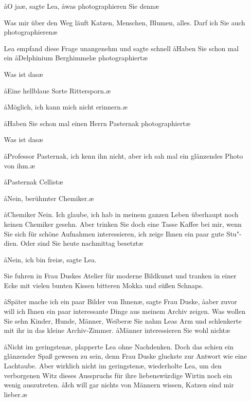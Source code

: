 \aa{}O ja\ae{}, sagte Lea, \aa{}was photographieren Sie denn\frag{}\ae{}

\aanah{}Was mir über den Weg läuft\ausr{} Katzen, Menschen, Blumen,
alles. Darf ich Sie auch photographieren\frag{}\ae{}

Lea empfand diese Frage unangenehm und sagte schnell\dopp{}
\aa{}Haben Sie schon mal ein \aa{}Delphinium Berghimmel\ae{}
photographiert\frag{}\ae{}

\aanah{}Was ist das\frag{}\ae{}

\aa{}Eine hellblaue Sorte Rittersporn.\ae{}

\aa{}Möglich, ich kann mich nicht erinnern.\ae{}

\aa{}Haben Sie schon mal einen Herrn Pasternak photographiert\frag{}\ae{}

\aanah{}Was ist das\frag{}\ae{}

\aa{}Professor Pasternak, ich kenn ihn nicht, aber ich sah mal ein
glänzendes Photo von ihm.\ae{}

\aa{}Pasternak\frag{} Cellist\frag{}\ae{}

\aa{}Nein, berühmter Chemiker.\ae{}

\aa{}Chemiker\frag{} Nein. Ich glaube, ich hab in meinem ganzen
Leben überhaupt noch keinen Chemiker gesehn. Aber trinken
Sie doch eine Tasse Kaffee bei mir, wenn Sie sich\eingriff{eS61-1}{Sich ] sich} für schöne
Aufnahmen interessieren, ich zeige Ihnen ein paar gute Stu"-%
dien. Oder sind Sie heute nachmittag besetzt\frag{}\ae{}

\aa{}Nein, ich bin frei\ae{}, sagte Lea.

Sie fuhren in Frau Duskes Atelier für moderne Bildkunst
und tranken in einer Ecke mit vielen bunten Kissen bitteren
Mokka und süßen Schnaps.

\aa{}Später mache ich ein paar Bilder von Ihnen\ae{}, sagte Frau
Duske, \aa{}aber zuvor will ich Ihnen ein paar interessante
Dinge aus meinem Archiv zeigen. Was wollen Sie sehn\frag{}
Kinder, Hunde, Männer, Weiber\frag{}\ae{} Sie nahm Leas Arm
und schlenkerte mit ihr in das kleine Archiv-Zimmer. \aa{}Männer
interessieren Sie wohl nicht\frag{}\ae{}

\aa{}Nicht im geringsten\ae{}, plapperte Lea ohne Nachdenken. Doch
das schien ein glänzender Spaß gewesen zu sein, denn Frau
Duske gluckste zur Antwort wie eine Lachtaube. \aanah{}Aber wirklich
nicht im geringsten\ae{}, wiederholte Lea, um den verborgenen
Witz dieses Ausspruchs für ihre liebenswürdige Wirtin noch
ein wenig auszutreten. \aa{}Ich will gar nichts von Männern
wissen, Katzen sind mir lieber.\ae{}


